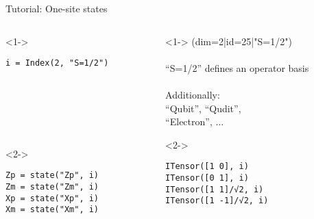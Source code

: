 \begin{frame}[fragile]{Tutorial: One-site states}

\begin{columns}

\begin{column}{4.5cm}

\begin{onlyenv}<1->
  \begin{lstlisting}[language=JuliaLocal, style=julia, basicstyle=\scriptsize\ttfamily]
  i = Index(2, "S=1/2")







  \end{lstlisting}
\end{onlyenv}

\begin{onlyenv}<2->
\begin{lstlisting}[language=JuliaLocal, style=julia, basicstyle=\scriptsize\ttfamily]
Zp = state("Zp", i)
Zm = state("Zm", i)
Xp = state("Xp", i)
Xm = state("Xm", i)
\end{lstlisting}
\end{onlyenv}

\end{column}

\begin{column}{5cm}

\begin{onlyenv}<1->
(dim=2|id=25|"S=1/2") \\
~\\
``S=1/2'' defines an operator basis \\
~\\
Additionally:\\
``Qubit'', ``Qudit'',\\
``Electron'', $\dots$
\end{onlyenv}

\begin{onlyenv}<2->
\vspace*{0.2cm}
~\\
\begin{lstlisting}[language=JuliaLocal, mathescape, style=julia, basicstyle=\scriptsize\ttfamily]
ITensor([1 0], i)
ITensor([0 1], i)
ITensor([1 1]/√2, i)
ITensor([1 -1]/√2, i)
\end{lstlisting}
\end{onlyenv}

\end{column}

\end{columns}

\end{frame}
